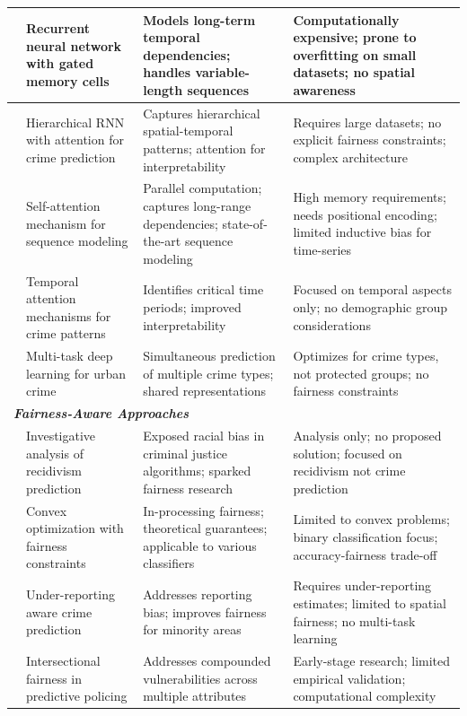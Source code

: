 \documentclass[conference]{IEEEtran}
\begin{document}
\begin{table}[htbp]
\begin{tabular}{p{2.2cm}p{2.8cm}p{4.2cm}p{4.2cm}}
\midrule
\cite{hochreiter1997long} & Recurrent neural network with gated memory cells & Models long-term temporal dependencies; handles variable-length sequences & Computationally expensive; prone to overfitting on small datasets; no spatial awareness \\
\midrule
\cite{huang2018deepcrime} & Hierarchical RNN with attention for crime prediction & Captures hierarchical spatial-temporal patterns; attention for interpretability & Requires large datasets; no explicit fairness constraints; complex architecture \\
\midrule
\cite{vaswani2017attention} & Self-attention mechanism for sequence modeling & Parallel computation; captures long-range dependencies; state-of-the-art sequence modeling & High memory requirements; needs positional encoding; limited inductive bias for time-series \\
\midrule
\cite{rodriguez2022temporal} & Temporal attention mechanisms for crime patterns & Identifies critical time periods; improved interpretability & Focused on temporal aspects only; no demographic group considerations \\
\midrule
\cite{patel2023multi} & Multi-task deep learning for urban crime & Simultaneous prediction of multiple crime types; shared representations & Optimizes for crime types, not protected groups; no fairness constraints \\
\midrule
\multicolumn{4}{l}{\textit{\textbf{Fairness-Aware Approaches}}} \\
\midrule
\cite{angwin2016machine} & Investigative analysis of recidivism prediction & Exposed racial bias in criminal justice algorithms; sparked fairness research & Analysis only; no proposed solution; focused on recidivism not crime prediction \\
\midrule
\cite{zafar2017fairness} & Convex optimization with fairness constraints & In-processing fairness; theoretical guarantees; applicable to various classifiers & Limited to convex problems; binary classification focus; accuracy-fairness trade-off \\
\midrule
\cite{wu2024improving} & Under-reporting aware crime prediction & Addresses reporting bias; improves fairness for minority areas & Requires under-reporting estimates; limited to spatial fairness; no multi-task learning \\
\midrule
\cite{lee2024intersectional} & Intersectional fairness in predictive policing & Addresses compounded vulnerabilities across multiple attributes & Early-stage research; limited empirical validation; computational complexity \\

\end{tabular}
\end{table}
\end{document}
